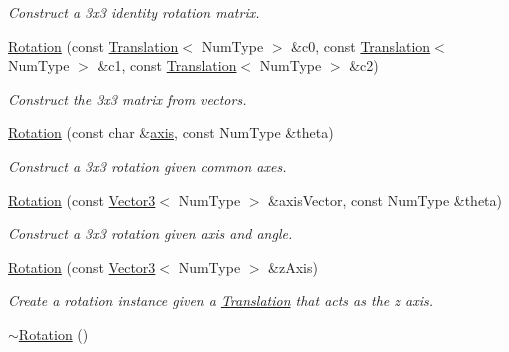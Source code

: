 \begin{DoxyCompactItemize}
\begin{DoxyCompactList}\small\item\em Construct a 3x3 identity rotation matrix. \end{DoxyCompactList}\item 
\hyperlink{singletonscrews_1_1_rotation_a39ea7087dcc2a48f2b937e97ce42ff00}{Rotation} (const \hyperlink{singletonscrews_1_1_translation}{Translation}$<$ Num\+Type $>$ \&c0, const \hyperlink{singletonscrews_1_1_translation}{Translation}$<$ Num\+Type $>$ \&c1, const \hyperlink{singletonscrews_1_1_translation}{Translation}$<$ Num\+Type $>$ \&c2)
\begin{DoxyCompactList}\small\item\em Construct the 3x3 matrix from vectors. \end{DoxyCompactList}\item 
\hyperlink{singletonscrews_1_1_rotation_a907da04fc1292357510ed18e9b25c05b}{Rotation} (const char \&\hyperlink{singletonscrews_1_1_rotation_a7ce8dc80a0e21118bc1c4361677f4a9f}{axis}, const Num\+Type \&theta)
\begin{DoxyCompactList}\small\item\em Construct a 3x3 rotation given common axes. \end{DoxyCompactList}\item 
\hyperlink{singletonscrews_1_1_rotation_a34694b15ae0316ce17fe445802a3b3a1}{Rotation} (const \hyperlink{singletonscrews_1_1_translation}{Vector3}$<$ Num\+Type $>$ \&axis\+Vector, const Num\+Type \&theta)
\begin{DoxyCompactList}\small\item\em Construct a 3x3 rotation given axis and angle. \end{DoxyCompactList}\item 
\hyperlink{singletonscrews_1_1_rotation_afc1c77ce3202b734e28727098177384d}{Rotation} (const \hyperlink{singletonscrews_1_1_translation}{Vector3}$<$ Num\+Type $>$ \&z\+Axis)
\begin{DoxyCompactList}\small\item\em Create a rotation instance given a \hyperlink{singletonscrews_1_1_translation}{Translation} that acts as the z axis. \end{DoxyCompactList}\item 
\hypertarget{singletonscrews_1_1_rotation_a6643143ff18766e37cc03290a3b6c22a}{\hyperlink{singletonscrews_1_1_rotation_a6643143ff18766e37cc03290a3b6c22a}{$\sim$\+Rotation} ()}\label{singletonscrews_1_1_rotation_a6643143ff18766e37cc03290a3b6c22a}


\end{DoxyCompactItemize}
